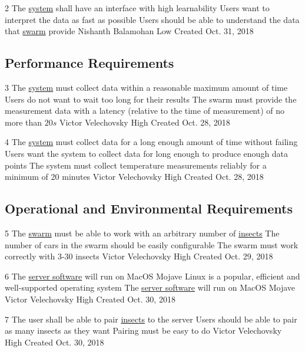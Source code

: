 \documentclass[11pt]{article}
\begin{document}
\nonFunctionalRequirement
{2}
{The \hyperref[sec:definitions]{system} shall have an interface with high learnability}
{Users want to interpret the data as fast as possible}
{Users should be able to understand the data that \hyperref[sec:definitions]{swarm} provide}
{Nishanth Balamohan}
{Low}
{Created Oct. 31, 2018}

\subsection{Performance Requirements}

\nonFunctionalRequirement
{3}
{The \hyperref[sec:definitions]{system} must collect data within a reasonable
maximum amount of time}
{Users do not want to wait too long for their results}
{The swarm must provide the measurement data with a latency (relative to the
time of measurement) of no more than $20s$}
{Victor Velechovsky}
{High}
{Created Oct. 28, 2018}

\nonFunctionalRequirement
{4}
{The \hyperref[sec:definitions]{system} must collect data for a long enough
amount of time without failing}
{Users want the system to collect data for long enough to produce enough
data points}
{The system must collect temperature measurements reliably for a minimum of
20 minutes}
{Victor Velechovsky}
{High}
{Created Oct. 28, 2018}

\subsection{Operational and Environmental Requirements}

\nonFunctionalRequirement
{5}
{The \hyperref[sec:definitions]{swarm} must be able to work with an arbitrary
number of \hyperref[sec:definitions]{insects}}
{The number of cars in the swarm should be easily configurable}
{The swarm must work correctly with 3-30 insects}
{Victor Velechovsky}
{High}
{Created Oct. 29, 2018}

\nonFunctionalRequirement
{6}
{The \hyperref[sec:definitions]{server software} will run on MacOS Mojave}
{Linux is a popular, efficient and well-supported operating system}
{The \hyperref[sec:definitions]{server software} will run on MacOS Mojave}
{Victor Velechovsky}
{High}
{Created Oct. 30, 2018}

\nonFunctionalRequirement
{7}
{The user shall be able to pair \hyperref[sec:definitions]{insects}
to the server}
{Users should be able to pair as many insects as they want}
{Pairing must be easy to do}
{Victor Velechovsky}
{High}
{Created Oct. 30, 2018}
\end{document}
